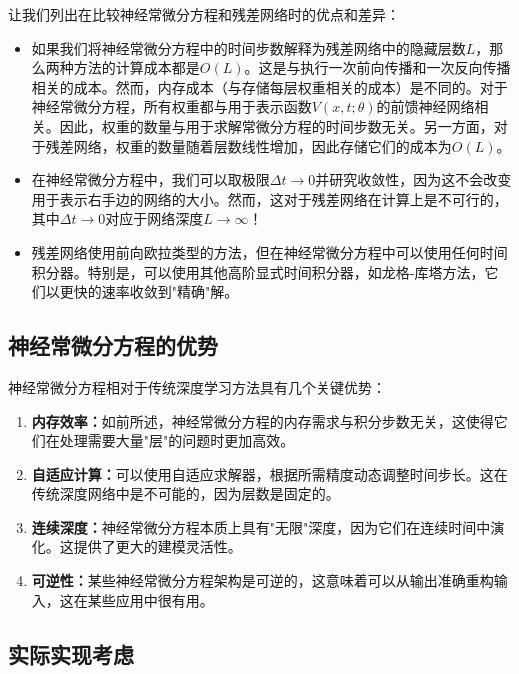 让我们列出在比较神经常微分方程和残差网络时的优点和差异：

\begin{itemize}
\item 如果我们将神经常微分方程中的时间步数解释为残差网络中的隐藏层数$L$，那么两种方法的计算成本都是$O(L)$。这是与执行一次前向传播和一次反向传播相关的成本。然而，内存成本（与存储每层权重相关的成本）是不同的。对于神经常微分方程，所有权重都与用于表示函数$V(x, t; \theta)$的前馈神经网络相关。因此，权重的数量与用于求解常微分方程的时间步数无关。另一方面，对于残差网络，权重的数量随着层数线性增加，因此存储它们的成本为$O(L)$。

\item 在神经常微分方程中，我们可以取极限$\Delta t \to 0$并研究收敛性，因为这不会改变用于表示右手边的网络的大小。然而，这对于残差网络在计算上是不可行的，其中$\Delta t \to 0$对应于网络深度$L \to \infty$！

\item 残差网络使用前向欧拉类型的方法，但在神经常微分方程中可以使用任何时间积分器。特别是，可以使用其他高阶显式时间积分器，如龙格-库塔方法，它们以更快的速率收敛到"精确"解。
\end{itemize}

\subsection{神经常微分方程的优势}
\label{subsec:neural_ode_advantages}

神经常微分方程相对于传统深度学习方法具有几个关键优势：

\begin{enumerate}
\item \textbf{内存效率：}如前所述，神经常微分方程的内存需求与积分步数无关，这使得它们在处理需要大量"层"的问题时更加高效。

\item \textbf{自适应计算：}可以使用自适应求解器，根据所需精度动态调整时间步长。这在传统深度网络中是不可能的，因为层数是固定的。

\item \textbf{连续深度：}神经常微分方程本质上具有"无限"深度，因为它们在连续时间中演化。这提供了更大的建模灵活性。

\item \textbf{可逆性：}某些神经常微分方程架构是可逆的，这意味着可以从输出准确重构输入，这在某些应用中很有用。
\end{enumerate}

\subsection{实际实现考虑}
\label{subsec:implementation_considerations}

